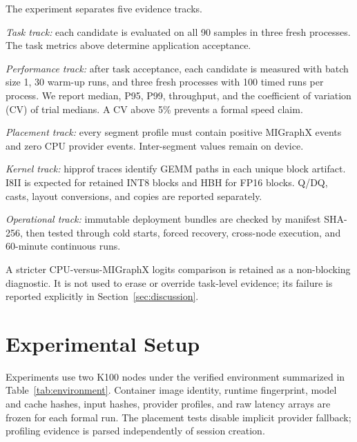 \documentclass[conference]{IEEEtran}
\begin{document}
The experiment separates five evidence tracks.

\textit{Task track:} each candidate is evaluated on all 90 samples in three fresh processes. The task metrics above determine application acceptance.

\textit{Performance track:} after task acceptance, each candidate is measured with batch size 1, 30 warm-up runs, and three fresh processes with 100 timed runs per process. We report median, P95, P99, throughput, and the coefficient of variation (CV) of trial medians. A CV above 5\% prevents a formal speed claim.

\textit{Placement track:} every segment profile must contain positive MIGraphX events and zero CPU provider events. Inter-segment values remain on device.

\textit{Kernel track:} hipprof traces identify GEMM paths in each unique block artifact. I8II is expected for retained INT8 blocks and HBH for FP16 blocks. Q/DQ, casts, layout conversions, and copies are reported separately.

\textit{Operational track:} immutable deployment bundles are checked by manifest SHA-256, then tested through cold starts, forced recovery, cross-node execution, and 60-minute continuous runs.

A stricter CPU-versus-MIGraphX logits comparison is retained as a non-blocking diagnostic. It is not used to erase or override task-level evidence; its failure is reported explicitly in Section~\ref{sec:discussion}.

\section{Experimental Setup}
\label{sec:setup}

Experiments use two K100 nodes under the verified environment summarized in Table~\ref{tab:environment}. Container image identity, runtime fingerprint, model and cache hashes, input hashes, provider profiles, and raw latency arrays are frozen for each formal run. The placement tests disable implicit provider fallback; profiling evidence is parsed independently of session creation.
\end{document}
